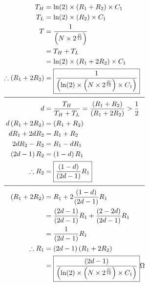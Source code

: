 \documentclass[10pt]{article}%
\begin{document}
\setlength{\baselineskip}{1.2\baselineskip}%
\begin{multicols*}{2}

\begin{align}
 T_{H} &= \ln(2) \times \left( R_{1} + R_{2} \right) \times C_{1} \\
 T_{L} &= \ln(2) \times \left( R_{2} \right) \times C_{1} \\
 T &= \frac{1}{\left( N \times {2}^{\frac{D}{12}} \right)} \\
  &= T_{H} + T_{L} \\
  &= \ln(2) \times \left( R_{1} + 2R_{2} \right) \times C_{1} \\
 \therefore \left( R_{1} + 2R_{2} \right) &= \boxed{\frac{1}{\left( \ln(2) \times \left( N \times {2}^{\frac{D}{12}} \right) \times C_{1} \right)}} \\
  \addlinespace\midrule\addlinespace
 d &= \frac{T_{H}}{T_{H} + T_{L}} = \frac{\left( R_{1} + R_{2} \right)}{\left( R_{1} + 2R_{2} \right)} > \frac{1}{2}\\
 d \left( R_{1} + 2R_{2} \right) &= \left( R_{1} + R_{2} \right) \\
 d R_{1} + 2d R_{2} &= R_{1} + R_{2} \\
 2d R_{2} - R_{2} &= R_{1} - d R_{1} \\
 \left( 2d - 1 \right) R_{2} &= \left( 1 - d \right) R_{1} \\
 \therefore R_{2} &= \boxed{\frac{\left( 1 - d \right)}{\left( 2d - 1 \right)} R_{1}} \\
  \addlinespace\midrule\addlinespace
\left( R_{1} + 2R_{2} \right) &= R_{1} + 2 \frac{\left( 1 - d \right)}{\left( 2d - 1 \right)} R_{1} \\
  &= \frac{{\left( 2d - 1 \right)}}{{\left( 2d - 1 \right)}} R_{1} + \frac{\left( 2 - 2d \right)}{\left( 2d - 1 \right)} R_{1} \\
  &= \frac{1}{{\left( 2d - 1 \right)}} R_{1} \\
 \therefore R_{1} &= \left( 2d - 1 \right) \left( R_{1} + 2R_{2} \right) \\
  &= \boxed{\frac{\left( 2d - 1 \right)}{\left( \ln(2) \times \left( N \times {2}^{\frac{D}{12}} \right) \times C_{1} \right)}} \Omega
\end{align}

\divider

\end{multicols*}
\end{document}
